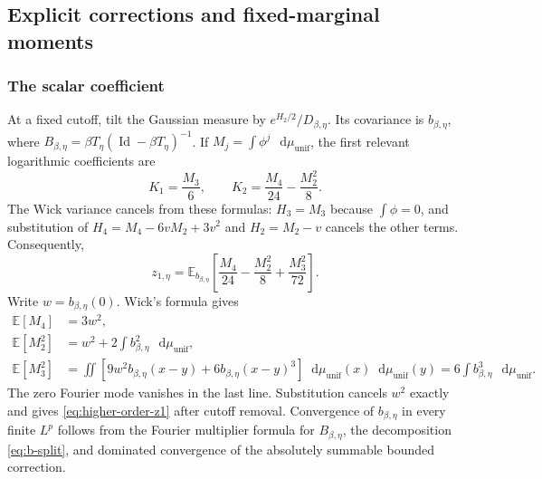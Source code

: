 \documentclass[11pt,reqno]{amsart}
\numberwithin{equation}{section}
\theoremstyle{plain}
\theoremstyle{definition}
\newcommand{\dd}{\mathop{}\!\mathrm d}
\newcommand{\E}{\mathbb E}
\newcommand{\Id}{\operatorname{Id}}
\newcommand{\be}{\beta}
\newcommand{\muunif}{\mu_{\mathrm{unif}}}
\begin{document}
\subsection{Explicit corrections and fixed-marginal moments}

\subsubsection{The scalar coefficient}
At a fixed cutoff, tilt the Gaussian measure by $e^{H_2/2}/D_{\be,\eta}$. Its covariance is $b_{\be,\eta}$, where $B_{\be,\eta}=\be T_\eta(\Id-\be T_\eta)^{-1}$. If $M_j=\int\phi^j\,\dd \muunif$, the first relevant logarithmic coefficients are
\begin{equation}\label{eq:first-polys}
 K_1=\frac{M_3}{6},\qquad
 K_2=\frac{M_4}{24}-\frac{M_2^2}{8}.
\end{equation}
The Wick variance cancels from these formulas: $H_3=M_3$ because $\int\phi=0$, and substitution of $H_4=M_4-6vM_2+3v^2$ and $H_2=M_2-v$ cancels the other terms. Consequently,
\begin{equation}\label{eq:first-expect}
 z_{1,\eta}=\E_{b_{\be,\eta}}\left[\frac{M_4}{24}-\frac{M_2^2}{8}+\frac{M_3^2}{72}\right].
\end{equation}
Write $w=b_{\be,\eta}(0)$. Wick's formula gives
\begin{align}
 \E[M_4]&=3w^2,\label{eq:M4}\\
 \E[M_2^2]&=w^2+2\int b_{\be,\eta}^2\,\dd \muunif,\label{eq:M22}\\
 \E[M_3^2]&=\iint\left[9w^2 b_{\be,\eta}(x-y)+6b_{\be,\eta}(x-y)^3\right]\dd \muunif(x)\dd \muunif(y)
 =6\int b_{\be,\eta}^3\,\dd \muunif.\label{eq:M32}
\end{align}
The zero Fourier mode vanishes in the last line. Substitution cancels $w^2$ exactly and gives \eqref{eq:higher-order-z1} after cutoff removal. Convergence of $b_{\be,\eta}$ in every finite $L^p$ follows from the Fourier multiplier formula for $B_{\be,\eta}$, the decomposition \eqref{eq:b-split}, and dominated convergence of the absolutely summable bounded correction.
\end{document}
